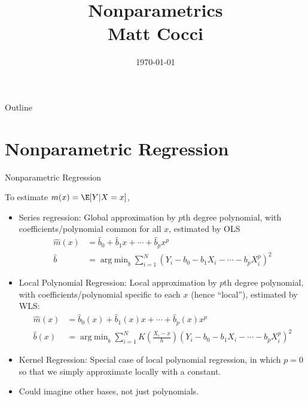 \documentclass[aspectratio=169, handout]{beamer}
\title[]{Nonparametrics \\ Matt Cocci}
\author[]{}
\date{\today}
\DeclareMathOperator*{\argmin}{arg\;min}
\newcommand{\sumiN}{\sum^N_{i=1}}
\begin{document}
\begin{frame}[plain]
\titlepage
\end{frame}


\begin{frame}{Outline}
\tableofcontents[hideallsubsections]
\end{frame}




\section{Nonparametric Regression}


{\scriptsize
\begin{frame}{Nonparametric Regression}

To estimate $m(x) = \E[Y|X=x]$,
\vspace{-3pt}
\pause
\begin{itemize}
  \item
    \alert{Series regression}:
    Global approximation by $p$th degree polynomial,
    with coefficients/polynomial \alert{common} for all $x$, estimated
    by OLS
    \begin{align*}
      \widehat{m}(x)
      &=
      \widehat{b}_0
      +
      \widehat{b}_1
      x
      +
      \cdots+
      \widehat{b}_p
      x^p
      \\
      \widehat{b}
      &=
      \argmin_b
      \sumiN
      (Y_i-b_0-b_1X_i-\cdots-b_pX_i^p)^2
    \end{align*}
    \pause

  \item
    \alert{Local Polynomial Regression}:
    Local approximation by $p$th degree polynomial, with
    coefficients/polynomial \alert{specific} to each $x$ (hence
    ``local''), estimated by WLS:
    \begin{align*}
      \widehat{m}(x)
      &=
      \widehat{b}_0(x)
      +
      \widehat{b}_1(x)
      x
      +
      \cdots+
      \widehat{b}_p(x)
      x^p
      \\
      \widehat{b}(x)
      &=
      \argmin_b
      \sumiN
      K\left(
      \frac{X_i-x}{h}
      \right)
      (Y_i-b_0-b_1X_i-\cdots-b_pX_i^p)^2
    \end{align*}

  \pause
  \item
    \alert{Kernel Regression}:
    Special case of local polynomial regression, in which $p=0$ so that
    we simply approximate locally with a constant.

  \pause
  \item Could imagine \alert{other bases}, not just polynomials.
\end{itemize}
\end{frame}
}
\end{document}
